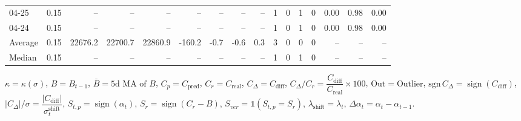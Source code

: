 \begin{threeparttable}
{\begin{tabular}{lrrrrrrrrrrrrrrr}
  04-25 &     0.15 &      -- &      -- &      -- &         -- &             -- &                       -- &                  -- &              1 &         0 &     1 &         0 &       0.00 &      0.98 &           0.00 \\
  04-24 &     0.15 &      -- &      -- &      -- &         -- &             -- &                       -- &                  -- &              1 &         0 &     1 &         0 &       0.00 &      0.98 &           0.00 \\
Average &     0.15 & 22676.2 & 22700.7 & 22860.9 &     -160.2 &           -0.7 &                     -0.6 &                 0.3 &              3 &         0 &     0 &         0 &         -- &        -- &             -- \\
 Median &     0.15 &      -- &      -- &      -- &         -- &             -- &                       -- &                  -- &              1 &         0 &     1 &         0 &         -- &        -- &             -- \\
\bottomrule
\end{tabular}
}
\begin{tablenotes}\footnotesize
\item $\kappa=\kappa(\sigma)$, $B=B_{t-1}$, $\overline{B}=\text{5d MA of }B$, $C_p=C_{\text{pred}}$, $C_r=C_{\text{real}}$, $C_\Delta=C_{\text{diff}}$, $C_\Delta/C_r=\dfrac{C_{\text{diff}}}{C_{\text{real}}}\times100$, $\mathrm{Out}=\text{Outlier}$, $\mathrm{sgn}\,C_\Delta=\operatorname{sign}(C_{\text{diff}})$, $|C_\Delta|/\sigma=\dfrac{|C_{\text{diff}}|}{\sigma_t^{\text{shift}}}$, $S_{t,p}=\operatorname{sign}(\alpha_t)$, $S_r=\operatorname{sign}(C_r - B)$, $S_{ver}=\mathbb{1}(S_{t,p}=S_r)$, $\lambda_{\text{shift}}=\lambda_t$, $\Delta\alpha_t=\alpha_t-\alpha_{t-1}$.\end{tablenotes}
\end{threeparttable}
\endgroup


